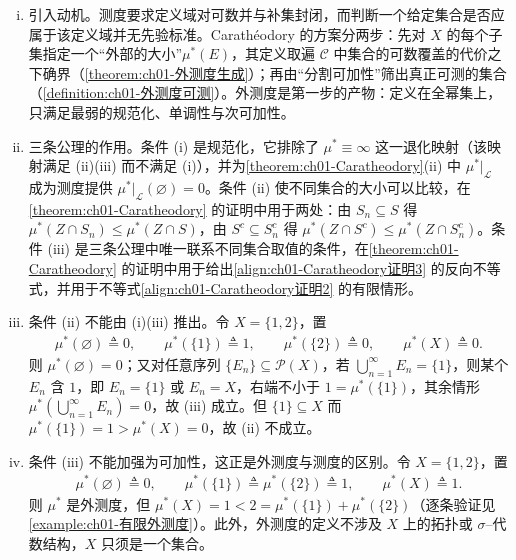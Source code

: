 \documentclass[../../main.tex]{subfiles}%
\begin{document}
\begin{remark}\label{remark:ch01-外测度}
\begin{enumerate}[(i)]
\item 引入动机。测度要求定义域对可数并与补集封闭，而判断一个给定集合是否应属于该定义域并无先验标准。Carathéodory 的方案分两步：先对 $X$ 的每个子集指定一个“外部的大小”$\mu^*(E)$，其定义取遍 $\mathcal{C}$ 中集合的可数覆盖的代价之下确界（\cref{theorem:ch01-外测度生成}）；再由“分割可加性”筛出真正可测的集合（\cref{definition:ch01-外测度可测}）。外测度是第一步的产物：定义在全幂集上，只满足最弱的规范化、单调性与次可加性。
\item 三条公理的作用。条件 (i) 是规范化，它排除了 $\mu^*\equiv\infty$ 这一退化映射（该映射满足 (ii)(iii) 而不满足 (i)），并为\cref{theorem:ch01-Caratheodory}(ii) 中 $\mu^*|_{\mathcal{L}}$ 成为测度提供 $\mu^*|_{\mathcal{L}}(\varnothing )=0$。条件 (ii) 使不同集合的大小可以比较，在\cref{theorem:ch01-Caratheodory} 的证明中用于两处：由 $S_n\subseteq S$ 得 $\mu^*(Z\cap S_n)\leqslant\mu^*(Z\cap S)$，由 $S^c\subseteq S_n^c$ 得 $\mu^*(Z\cap S^c)\leqslant\mu^*(Z\cap S_n^c)$。条件 (iii) 是三条公理中唯一联系不同集合取值的条件，在\cref{theorem:ch01-Caratheodory} 的证明中用于给出\eqref{align:ch01-Caratheodory证明3} 的反向不等式，并用于不等式\eqref{align:ch01-Caratheodory证明2} 的有限情形。
\item 条件 (ii) 不能由 (i)(iii) 推出。令 $X=\{1,2\}$，置
\begin{align*}
\mu^*(\varnothing )\triangleq 0,\qquad \mu^*(\{1\})\triangleq 1,\qquad \mu^*(\{2\})\triangleq 0,\qquad \mu^*(X)\triangleq 0.
\end{align*}
则 $\mu^*(\varnothing )=0$；又对任意序列 $\{E_n\}\subseteq\mathcal{P}(X)$，若 $\bigcup_{n=1}^\infty E_n=\{1\}$，则某个 $E_n$ 含 $1$，即 $E_n=\{1\}$ 或 $E_n=X$，右端不小于 $1=\mu^*(\{1\})$，其余情形 $\mu^*\left(\bigcup_{n=1}^\infty E_n\right)=0$，故 (iii) 成立。但 $\{1\}\subseteq X$ 而 $\mu^*(\{1\})=1>\mu^*(X)=0$，故 (ii) 不成立。
\item 条件 (iii) 不能加强为可加性，这正是外测度与测度的区别。令 $X=\{1,2\}$，置
\begin{align*}
\mu^*(\varnothing )\triangleq 0,\qquad \mu^*(\{1\})\triangleq\mu^*(\{2\})\triangleq 1,\qquad \mu^*(X)\triangleq 1.
\end{align*}
则 $\mu^*$ 是外测度，但 $\mu^*(X)=1<2=\mu^*(\{1\})+\mu^*(\{2\})$（逐条验证见\cref{example:ch01-有限外测度}）。此外，外测度的定义不涉及 $X$ 上的拓扑或 $\sigma$--代数结构，$X$ 只须是一个集合。
\end{enumerate}
\end{remark}
\end{document}
